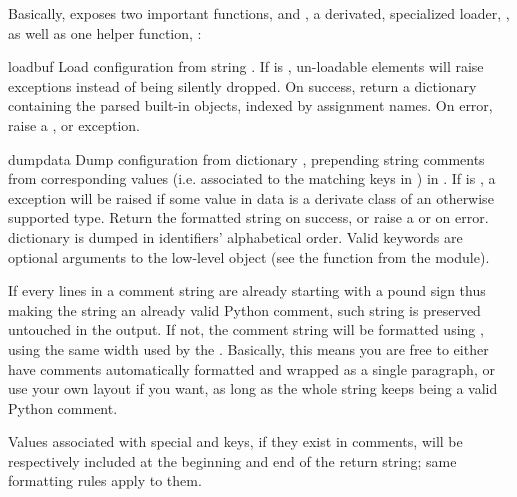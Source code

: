 \documentclass{howto}
\begin{document}
Basically,  exposes two important functions, 
and , a derivated, specialized loader, , as well
as one helper function, :

\begin{funcdesc}{load}{buf}
Load configuration from string . If  is ,
un-loadable elements will raise  exceptions instead of
being silently dropped. On success, return a dictionary containing the parsed
built-in objects, indexed by assignment names. On error, raise a
,  or 
exception.
\end{funcdesc}

\begin{funcdesc}{dump}{data}
Dump configuration from dictionary , prepending string comments from
corresponding values (i.e. associated to the matching keys in ) in
. If  is , a 
exception will be raised if some value in data is a derivate class of an
otherwise supported type. Return the formatted string on success, or raise a
 or  on error.  dictionary
is dumped in identifiers' alphabetical order. Valid keywords are optional
arguments to the low-level  object (see the
 function from the  module).

If every lines in a comment string are already starting with a pound sign thus
making the string an already valid Python comment, such string is preserved
untouched in the output. If not, the comment string will be formatted using
, using the same width used by the
. Basically, this means you are free to either have
comments automatically formatted and wrapped as a single paragraph, or use your
own layout if you want, as long as the whole string keeps being a valid Python
comment.

Values associated with special  and  keys, if
they exist in comments, will be respectively included at the beginning and end
of the return string; same formatting rules apply to them.
\end{funcdesc}
\end{document}
